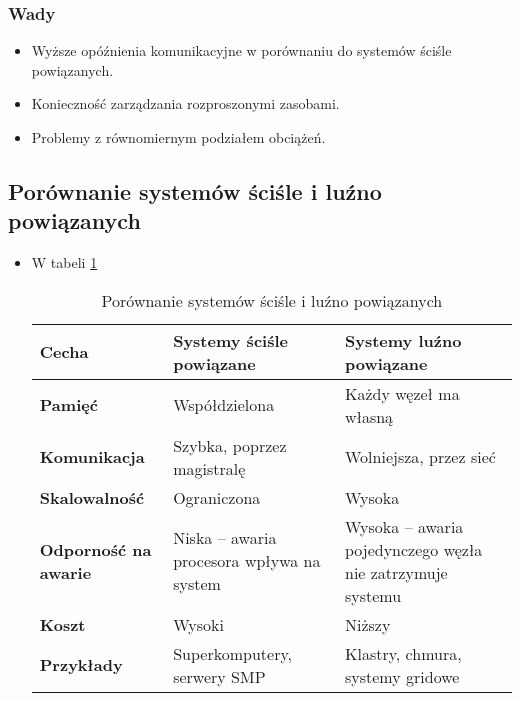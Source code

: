 \subsubsection{Wady}
\begin{itemize}
    \item Wyższe opóźnienia komunikacyjne w porównaniu do systemów ściśle powiązanych.
    \item Konieczność zarządzania rozproszonymi zasobami.
    \item Problemy z równomiernym podziałem obciążeń.
\end{itemize}

\subsection{Porównanie systemów ściśle i luźno powiązanych}
\begin{itemize}
    \item W tabeli \ref{tab:scisle_luzno}
\begin{table}[h]
    \centering
    \renewcommand{\arraystretch}{1.3} %
    \begin{tabularx}{\textwidth}{|l|X|X|}
        \hline
        \textbf{Cecha} & \textbf{Systemy ściśle powiązane} & \textbf{Systemy luźno powiązane} \\
        \hline
        \textbf{Pamięć} & Współdzielona & Każdy węzeł ma własną \\
        \hline
        \textbf{Komunikacja} & Szybka, poprzez magistralę & Wolniejsza, przez sieć \\
        \hline
        \textbf{Skalowalność} & Ograniczona & Wysoka \\
        \hline
        \textbf{Odporność na awarie} & Niska – awaria procesora wpływa na system & Wysoka – awaria pojedynczego węzła nie zatrzymuje systemu \\
        \hline
        \textbf{Koszt} & Wysoki & Niższy \\
        \hline
        \textbf{Przykłady} & Superkomputery, serwery SMP & Klastry, chmura, systemy gridowe \\
        \hline
    \end{tabularx}
    \caption{Porównanie systemów ściśle i luźno powiązanych}
    \label{tab:scisle_luzno}  %
 \end{table}

\end{itemize}


